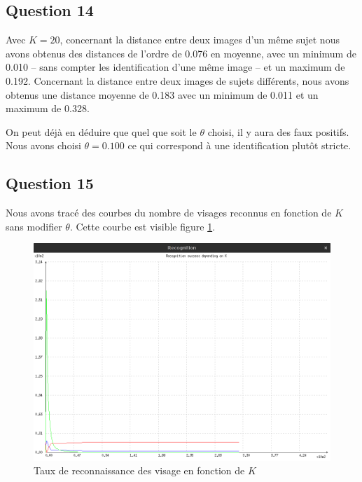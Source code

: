\documentclass[a4paper]{article}
\begin{document}
\subsection{Question 14}

Avec $K=20$, concernant la distance entre deux images d'un même sujet nous avons obtenus des distances de
l'ordre de 0.076 en moyenne, 
avec un minimum de 0.010 
-- sans compter les identification d'une même image --
et un maximum de 0.192.
Concernant la distance entre deux images de sujets différents, nous avons obtenus une 
distance moyenne de 0.183 
avec un minimum de 0.011
et un maximum de 0.328.

On peut déjà en déduire que quel que soit le $\theta$ choisi, il y aura des faux positifs.
Nous avons choisi $\theta = 0.100$ ce qui correspond à une identification plutôt stricte.

\subsection{Question 15}

Nous avons tracé des courbes du nombre de visages reconnus en fonction de $K$ sans modifier $\theta$.
Cette courbe est visible figure \ref{q15}.

\begin{figure}[!ht]
    \centering
    \includegraphics[width=\textwidth]{img/q15_recognition.png}
    \caption{Taux de reconnaissance des visage en fonction de $K$}
    \label{q15}
\end{figure}
\end{document}
